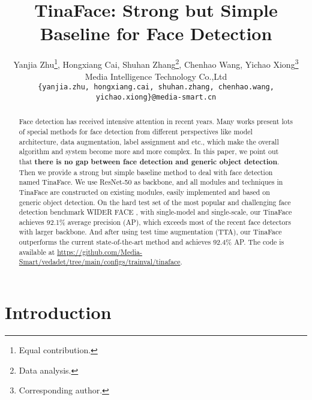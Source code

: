 \documentclass[final]{cvpr}
\begin{document}
\title{TinaFace: Strong but Simple Baseline for Face Detection}

\author{
 Yanjia Zhu\thanks{Equal contribution.}, Hongxiang Cai\footnotemark[1], Shuhan Zhang\thanks{Data analysis.}, Chenhao Wang\footnotemark[2], Yichao Xiong\thanks{Corresponding author.} \\
  Media Intelligence Technology Co.,Ltd\\
  \texttt{\small \{yanjia.zhu, hongxiang.cai, shuhan.zhang, chenhao.wang, yichao.xiong\}@media-smart.cn} 
}

\maketitle
\begin{abstract}
Face detection has received intensive attention in recent years. Many works present lots of special methods for face detection from different perspectives like model architecture, data augmentation, label assignment and etc., which make the overall algorithm and system become more and more complex. In this paper, we point out that \textbf{there is no gap between face detection and generic object detection}. Then we provide a strong but simple baseline method to deal with face detection named TinaFace. We use ResNet-50 \cite{he2016deep} as backbone, and all modules and techniques in TinaFace are constructed on existing modules, easily implemented and based on generic object detection. On the hard test set of the most popular and challenging face detection benchmark WIDER FACE \cite{yang2016wider}, with single-model and single-scale, our TinaFace achieves 92.1\% average precision (AP), which exceeds most of the recent face detectors with larger backbone. And after using test time augmentation (TTA), our TinaFace outperforms the current state-of-the-art method and achieves 92.4\% AP. The code is available at \url{https://github.com/Media-Smart/vedadet/tree/main/configs/trainval/tinaface}.
\end{abstract}




\section{Introduction}
\end{document}
